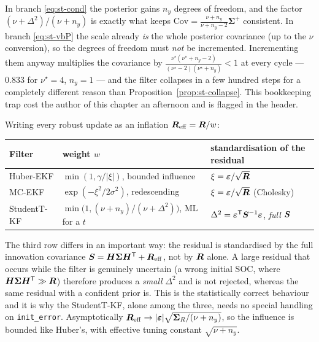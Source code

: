 \begin{remark}\label{rem:st-dof}
In branch \eqref{eq:st-cond} the posterior gains $n_y$ degrees of freedom, and the factor
$(\nu+\Delta^2)/(\nu+n_y)$ is exactly what keeps
$\mathrm{Cov}=\frac{\nu+n_y}{\nu+n_y-2}\bm\Sigma^+$ consistent.  In branch \eqref{eq:st-vbP} the
scale already \emph{is} the whole posterior covariance (up to the $\nu$ conversion), so the degrees
of freedom must \emph{not} be incremented.  Incrementing them anyway multiplies the covariance by
$\frac{\nu^\star(\nu^\star+n_y-2)}{(\nu^\star-2)(\nu^\star+n_y)}<1$ at every cycle --- $0.833$ for
$\nu^\star=4$, $n_y=1$ --- and the filter collapses in a few hundred steps for a completely
different reason than Proposition~\ref{prop:st-collapse}.  This bookkeeping trap cost the author
of this chapter an afternoon and is flagged in the header.
\end{remark}

\begin{remark}\label{rem:st-weights}
Writing every robust update as an inflation $\bm{R}_{\mathrm{eff}}=\bm{R}/w$:
\begin{center}\small
\begin{tabular}{@{}lll@{}}
\toprule
Filter & weight $w$ & standardisation of the residual\\
\midrule
Huber-EKF   & $\min(1,\gamma/|\xi|)$, bounded influence & $\xi=\bm{\varepsilon}/\sqrt{\bm{R}}$ \\
MC-EKF      & $\exp(-\xi^2/2\sigma^2)$, redescending & $\xi=\bm{\varepsilon}/\sqrt{\bm{R}}$ (Cholesky) \\
StudentT-KF & $\min\!\big(1,(\nu+n_y)/(\nu+\Delta^2)\big)$, ML for a $t$ &
              $\Delta^2=\bm{\varepsilon}^{\mathsf{T}}\bm{S}^{-1}\bm{\varepsilon}$, \emph{full} $\bm{S}$\\
\bottomrule
\end{tabular}
\end{center}
The third row differs in an important way: the residual is standardised by the full innovation
covariance $\bm{S}=\bm{H}\bm\Sigma\bm{H}^{\mathsf{T}}+\bm{R}_{\mathrm{eff}}$, not by $\bm{R}$ alone.  A large residual that
occurs while the filter is genuinely uncertain (a wrong initial SOC, where
$\bm{H}\bm\Sigma\bm{H}^{\mathsf{T}}\gg\bm{R}$) therefore produces a \emph{small} $\Delta^2$ and is not rejected,
whereas the same residual with a confident prior is.  This is the statistically correct behaviour
and it is why the StudentT-KF, alone among the three, needs no special handling on
\texttt{init\_error}.  Asymptotically $\bm{R}_{\mathrm{eff}}\to|\bm{\varepsilon}|\sqrt{\bm\Sigma_R/(\nu+n_y)}$,
so the influence is bounded like Huber's, with effective tuning constant $\sqrt{\nu+n_y}$.
\end{remark}

